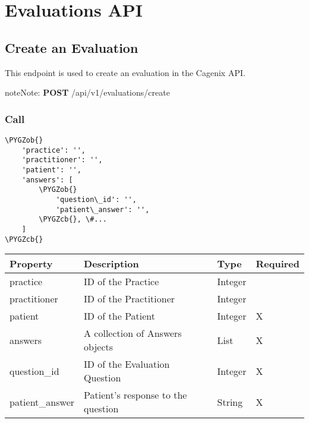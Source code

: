 \documentclass[letterpaper,10pt,english]{sphinxmanual}
\def\PYGZob{\char`\{}
\def\PYGZcb{\char`\}}
\begin{document}
\chapter{Evaluations API}
\label{dev-api-evaluations::doc}\label{dev-api-evaluations:evaluations-api}

\section{Create an Evaluation}
\label{dev-api-evaluations:create-an-evaluation}
This endpoint is used to create an evaluation in the Cagenix API.

\begin{notice}{note}{Note:}
\textbf{POST} /api/v1/evaluations/create
\end{notice}


\subsection{Call}
\label{dev-api-evaluations:call}
\begin{Verbatim}[commandchars=\\\{\}]
\PYGZob{}
    'practice': '',
    'practitioner': '',
    'patient': '',
    'answers': [
        \PYGZob{}
            'question\_id': '',
            'patient\_answer': '',
        \PYGZcb{}, \#...
    ]
\PYGZcb{}
\end{Verbatim}

\begin{tabulary}{\linewidth}{|L|L|L|L|}
\hline
\textsf{\relax 
Property
} & \textsf{\relax 
Description
} & \textsf{\relax 
Type
} & \textsf{\relax 
Required
}\\
\hline
practice
 & 
ID of the Practice
 & 
Integer
 & \\

practitioner
 & 
ID of the Practitioner
 & 
Integer
 & \\

patient
 & 
ID of the Patient
 & 
Integer
 & 
X
\\

answers
 & 
A collection of Answers objects
 & 
List
 & 
X
\\

question\_id
 & 
ID of the Evaluation Question
 & 
Integer
 & 
X
\\

patient\_answer
 & 
Patient's response to the question
 & 
String
 & 
X
\\
\hline\end{tabulary}
\end{document}
